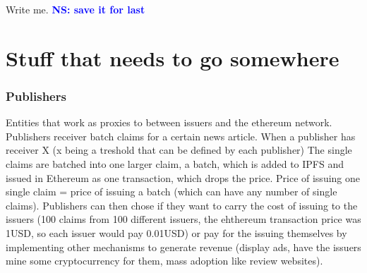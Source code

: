 \documentclass[letterpaper,twocolumn,10pt]{article}
\newcommand{\note}[1]{\textcolor{blue}{\bf #1}}
\begin{document}
Write me. \note{NS: save it for last}

\section{Stuff that needs to go somewhere}
\subsubsection{Publishers}
Entities that work as proxies to between issuers and the ethereum network.
Publishers receiver batch claims for a certain news article. When a publisher has receiver X (x being a treshold that can be defined by each publisher)
The single claims are batched into one larger claim, a batch, which is added to IPFS and issued in Ethereum as one transaction, which drops the price. Price of issuing one single claim = price of issuing a batch (which can have any number of single claims).
Publishers can then chose if they want to carry the cost of issuing to the issuers (100 claims from 100 different issuers, the ehthereum transaction price was 1USD, so each issuer would pay 0.01USD) or pay for the issuing themselves by implementing other mechanisms to generate revenue (display ads, have the issuers mine some cryptocurrency for them, mass adoption like review websites).
\end{document}
